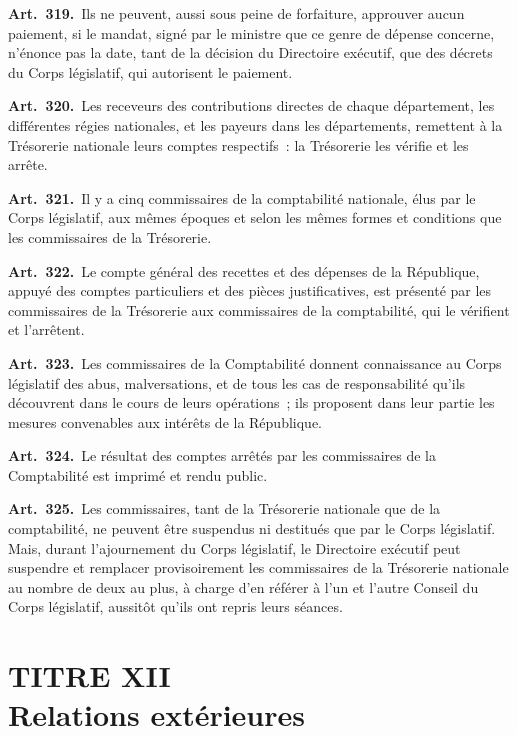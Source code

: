 \documentclass[french,twoside]{book} %
\newcommand{\labelchar}[1]{\textbf{\color{rubric} #1}}
\begin{document}
\labelchar{Art. 319.} Ils ne peuvent, aussi sous peine de forfaiture, approuver aucun paiement, si le mandat, signé par le ministre que ce genre de dépense concerne, n’énonce pas la date, tant de la décision du Directoire exécutif, que des décrets du Corps législatif, qui autorisent le paiement.\par
\labelchar{Art. 320.} Les receveurs des contributions directes de chaque département, les différentes régies nationales, et les payeurs dans les départements, remettent à la Trésorerie nationale leurs comptes respectifs : la Trésorerie les vérifie et les arrête.\par
\labelchar{Art. 321.} Il y a cinq commissaires de la comptabilité nationale, élus par le Corps législatif, aux mêmes époques et selon les mêmes formes et conditions que les commissaires de la Trésorerie.\par
\labelchar{Art. 322.} Le compte général des recettes et des dépenses de la République, appuyé des comptes particuliers et des pièces justificatives, est présenté par les commissaires de la Trésorerie aux commissaires de la comptabilité, qui le vérifient et l’arrêtent.\par
\labelchar{Art. 323.} Les commissaires de la Comptabilité donnent connaissance au Corps législatif des abus, malversations, et de tous les cas de responsabilité qu’ils découvrent dans le cours de leurs opérations ; ils proposent dans leur partie les mesures convenables aux intérêts de la République.\par
\labelchar{Art. 324.} Le résultat des comptes arrêtés par les commissaires de la Comptabilité est imprimé et rendu public.\par
\labelchar{Art. 325.} Les commissaires, tant de la Trésorerie nationale que de la comptabilité, ne peuvent être suspendus ni destitués que par le Corps législatif. Mais, durant l’ajournement du Corps législatif, le Directoire exécutif peut suspendre et remplacer provisoirement les commissaires de la Trésorerie nationale au nombre de deux au plus, à charge d’en référer à l’un et l’autre Conseil du Corps législatif, aussitôt qu’ils ont repris leurs séances.\par
\bigbreak

\section[{TITRE XII. Relations extérieures}]{TITRE XII \\
Relations extérieures}
\end{document}
